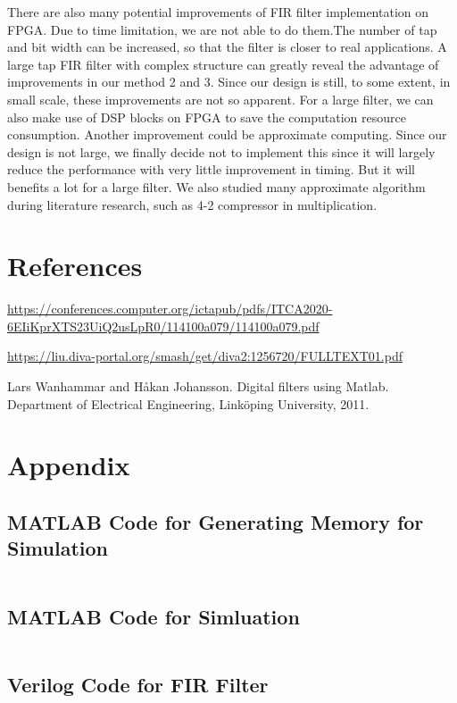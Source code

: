 \documentclass[a4paper]{article}
\begin{document}
There are also many potential improvements of FIR filter implementation on FPGA. Due to time limitation, we are not able to do them.The number of tap and bit width can be increased, so that the filter is closer to real applications. A large tap FIR filter with complex structure can greatly reveal the advantage of improvements in our method 2 and 3. Since our design is still, to some extent, in small scale, these improvements are not so apparent. For a large filter, we can also make use of DSP blocks on FPGA to save the computation resource consumption. Another improvement could be approximate computing. Since our design is not large, we finally decide not to implement this since it will largely reduce the performance with very little improvement in timing. But it will benefits a lot for a large filter. We also studied many approximate algorithm during literature research, such as 4-2 compressor in multiplication. 
\section{References}
\noindent [1] \url{https://conferences.computer.org/ictapub/pdfs/ITCA2020-6EIiKprXTS23UiQ2usLpR0/114100a079/114100a079.pdf}

\noindent [2] \url{https://liu.diva-portal.org/smash/get/diva2:1256720/FULLTEXT01.pdf}

\noindent [3] Lars Wanhammar and Håkan Johansson. Digital filters using Matlab. Department of
Electrical Engineering, Linköping University, 2011.
\section{Appendix}
\subsection{MATLAB Code for Generating Memory for Simulation}
\inputminted[frame=single,bgcolor=bg,breaklines,breakanywhere,linenos]{matlab}{generate_mem.m}
\subsection{MATLAB Code for Simluation}
\inputminted[frame=single,bgcolor=bg,breaklines,breakanywhere,linenos]{matlab}{simulation.m}
\subsection{Verilog Code for FIR Filter}
\inputminted[frame=single,bgcolor=bg,breaklines,breakanywhere,linenos]{verilog}{FIR_top.v}
\end{document}
